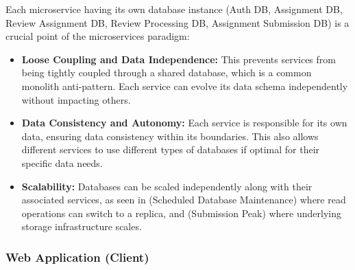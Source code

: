 \begin{justify}
    Each microservice having its own database instance (Auth DB, Assignment DB, Review Assignment DB, Review Processing DB, Assignment Submission DB) is a crucial point of the microservices paradigm:
\end{justify}
\begin{itemize}
    \item \textbf{Loose Coupling and Data Independence:} This prevents services from being tightly coupled through a shared database, which is a common monolith anti-pattern. Each service can evolve its data schema independently without impacting others.
    \item \textbf{Data Consistency and Autonomy:} Each service is responsible for its own data, ensuring data consistency within its boundaries. This also allows different services to use different types of databases if optimal for their specific data needs.
    \item \textbf{Scalability:} Databases can be scaled independently along with their associated services, as seen in  (Scheduled Database Maintenance) where read operations can switch to a replica, and  (Submission Peak) where underlying storage infrastructure scales.
\end{itemize}

\subsubsection{Web Application (Client)}

